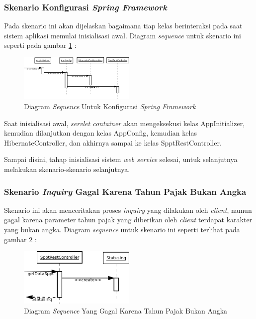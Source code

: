 \documentclass[pdftex,12pt, oneside]{article}
\begin{document}
\subsubsection{Skenario Konfigurasi \textit{Spring Framework}}

Pada skenario ini akan dijelaskan bagaimana tiap kelas berinteraksi pada saat sistem aplikasi memulai inisialisasi awal. Diagram \textit{sequence} untuk skenario ini seperti pada gambar \ref{fig:uml-seq-konf} :

\begin{figure}[H]
  \centering
  \includegraphics[width=0.5\textwidth]{./resources/diagram/uml-seq-konf}
  \caption{Diagram \textit{Sequence} Untuk Konfigurasi \textit{Spring Framework}}
  \label{fig:uml-seq-konf}
\end{figure}

Saat inisialisasi awal, \textit{servlet container} akan mengeksekusi kelas AppInitializer, kemudian dilanjutkan dengan kelas AppConfig, kemudian kelas HibernateController, dan akhirnya sampai ke kelas SpptRestController.

Sampai disini, tahap inisialisasi sistem \textit{web service} selesai, untuk selanjutnya melakukan skenario-skenario selanjutnya.

\subsubsection{Skenario \textit{Inquiry} Gagal Karena Tahun Pajak Bukan Angka}

Skenario ini akan menceritakan proses \textit{inquiry} yang dilakukan oleh \textit{client}, namun gagal karena parameter tahun pajak yang diberikan oleh \textit{client} terdapat karakter yang bukan angka. Diagram \textit{sequence} untuk skenario ini seperti terlihat pada gambar \ref{fig:uml-seq-inq-thn-not-valid} :

\begin{figure}[H]
  \centering
  \includegraphics[width=0.5\textwidth]{./resources/diagram/uml-seq-inq-thn-not-valid}
  \caption{Diagram \textit{Sequence} Yang Gagal Karena Tahun Pajak Bukan Angka}
  \label{fig:uml-seq-inq-thn-not-valid}
\end{figure}
\end{document}
